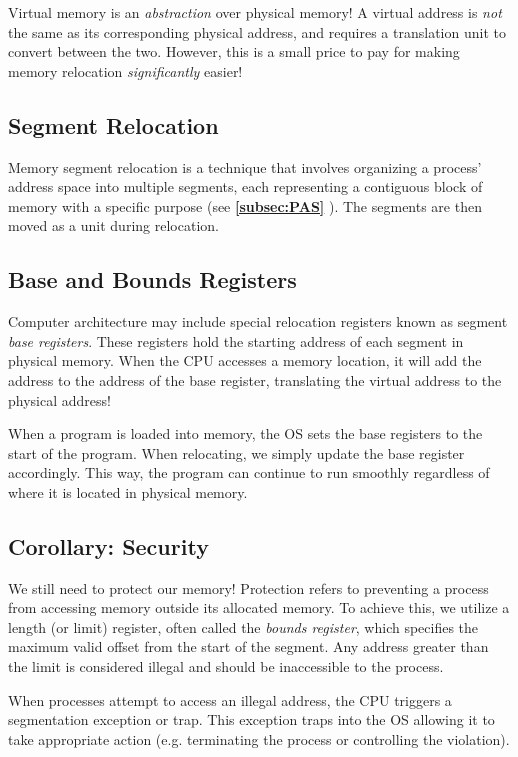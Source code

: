 \documentclass{report}
\newcommand{\abstractionBegin}[1]{\begin{tcolorbox}[colback=violet!5!white,colframe=violet,title={Abstraction:
      #1}]}
\newcommand{\abstractionEnd}{\end{tcolorbox}}
\newcommand{\refto}[2]{\textbf{\ref{#1:#2} \nameref{#1:#2}}}
\begin{document}
\abstractionBegin{Virtual Memory}
Virtual memory is an \textit{abstraction} over physical memory! A virtual address is \textit{not}
the same as its corresponding physical address, and requires a translation unit to convert between
the two. However, this is a small price to pay for making memory relocation \textit{significantly}
easier!
\abstractionEnd

\subsection{Segment Relocation}
Memory segment relocation is a technique that involves organizing a process' address space into
multiple segments, each representing a contiguous block of memory with a specific purpose (see
\refto{subsec}{PAS}). The segments are then moved as a unit during relocation.


\subsection{Base and Bounds Registers}
Computer architecture may include special relocation registers known as segment \textit{base
registers}. These registers hold the starting address of each segment in physical memory. When the
CPU accesses a memory location, it will add the address to the address of the base register,
translating the virtual address to the physical address!

When a program is loaded into memory, the OS sets the base registers to the start of the
program. When relocating, we simply update the base register accordingly. This way, the program can
continue to run smoothly regardless of where it is located in physical memory.


\subsection*{Corollary: Security}
We still need to protect our memory! Protection refers to preventing a process from accessing memory
outside its allocated memory. To achieve this, we utilize a length (or limit) register, often
called the \textit{bounds register}, which specifies the maximum valid offset from the start of the
segment. Any address greater than the limit is considered illegal and should be inaccessible to the
process. 

When processes attempt to access an illegal address, the CPU triggers a segmentation exception or
trap. This exception traps into the OS allowing it to take appropriate action (e.g. terminating the
process or controlling the violation).
\end{document}
